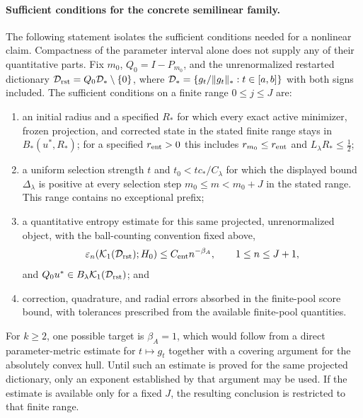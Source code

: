 \documentclass[11pt]{article}
\theoremstyle{remark}
\begin{document}
\paragraph{Sufficient conditions for the concrete semilinear family.}
The following statement isolates the sufficient conditions needed for a
nonlinear claim. Compactness of the parameter interval alone does not supply any of
their quantitative parts. Fix $m_0$, $Q_0=I-P_{m_0}$, and the unrenormalized restarted
dictionary $\mathcal D_{\rm rst}=Q_0\mathcal D_*\setminus\{0\}$, where
$\mathcal D_*=\{g_t/\|g_t\|_*:t\in[a,b]\}$ with both signs included.  The sufficient conditions on a finite range $0\leq j\leq J$ are:
\begin{enumerate}[label=(A\arabic*)]
  \item an initial radius and a specified $R_*$ for which every exact active
  minimizer, frozen projection, and corrected state in the stated finite range stays in
  $B_*(u^*,R_*)$; for a specified $r_{\rm ent}>0$ this includes
  $r_{m_0}\leq r_{\rm ent}$ and
  $L_\lambda R_*\leq\tfrac12$;
  \item a uniform selection strength $t$ and $t_0<tc_*/C_\lambda$ for
  which the displayed bound $\Delta_\lambda$ is positive at every
  selection step $m_0\leq m<m_0+J$ in the stated range.  This range
  contains no exceptional prefix;
  \item a quantitative entropy estimate for this same projected,
  unrenormalized object, with the ball-counting convention fixed above,
  \begin{equation}
    \varepsilon_n\!\left(\mathcal K_1(\mathcal D_{\rm rst});H_0\right)
       \leq C_{\rm ent}n^{-\beta_A},
       \qquad 1\leq n\leq J+1,
    \label{eq:c5-family-entropy-certificate}
  \end{equation}
  and $Q_0u^*\in B_\lambda\mathcal K_1(\mathcal D_{\rm rst})$; and
  \item correction, quadrature, and radial errors absorbed in the
  finite-pool score bound, with tolerances prescribed from the available finite-pool quantities.
\end{enumerate}
For $k\geq2$, one possible target is $\beta_A=1$, which would follow from a direct
parameter-metric estimate for $t\mapsto g_t$ together with a covering argument for the
absolutely convex hull. Until such an estimate is proved for the same projected dictionary,
only an exponent established by that argument may be used. If the estimate is available only
for a fixed $J$, the resulting conclusion is restricted to that finite range.
\end{document}
